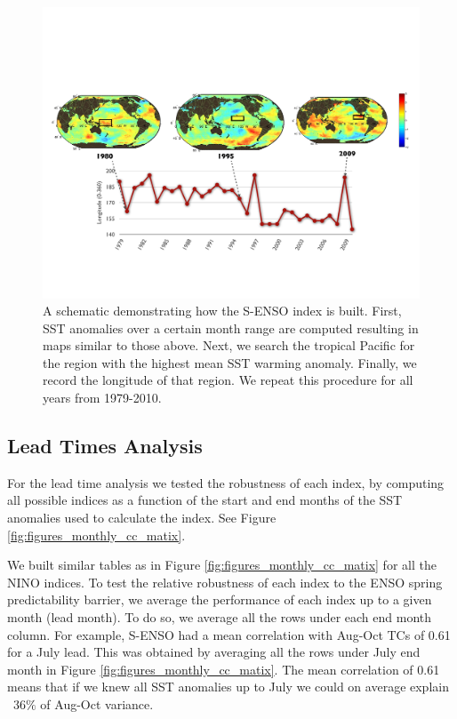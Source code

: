 \begin{figure}[htbp]
	 	\centering
		\includegraphics[width=5in]{figures/s_enso_graphic.pdf}
	\caption{A schematic demonstrating how the S-ENSO index is built. First, SST anomalies over a certain month range are computed resulting in maps similar to those above. Next, we search the tropical Pacific for the region with the highest mean SST warming anomaly. Finally, we record the longitude of that region. We repeat this procedure for all years from 1979-2010. }
	\label{fig:s_enso_graphic}
\end{figure}

\subsection{Lead Times Analysis}
For the lead time analysis we tested the robustness of each index, by computing all possible indices as a function of the start and end months of the SST anomalies used to calculate the index. See Figure \ref{fig:figures_monthly_cc_matix}.

We built similar tables as in Figure \ref{fig:figures_monthly_cc_matix} for all the NINO indices. To test the relative robustness of each index to the ENSO spring predictability barrier, we average the performance of each index up to a given month (lead month). To do so, we average all the rows under each end month column. For example, S-ENSO had a mean correlation with Aug-Oct TCs of 0.61 for a July lead. This was obtained by averaging all the rows under July end month in Figure \ref{fig:figures_monthly_cc_matix}. The mean correlation of 0.61 means that if we knew all SST anomalies up to July we could on average explain ~$36\%$ of Aug-Oct variance.

